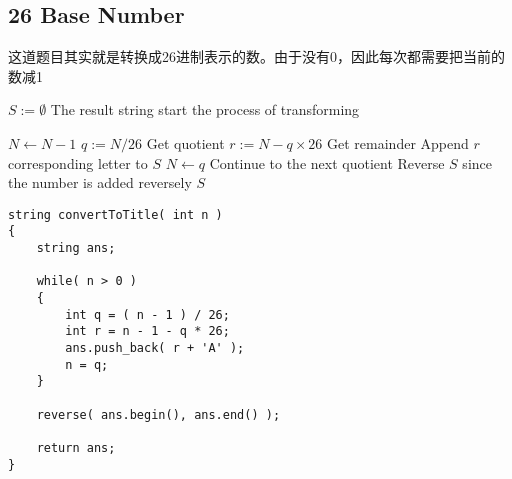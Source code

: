 \subsection{26 Base Number}
\begin{CJK*}{UTF8}{gbsn}
这道题目其实就是转换成26进制表示的数。由于没有0，因此每次都需要把当前的数减1
\end{CJK*}
\setcounter{algorithm}{0}
\begin{algorithm}[H]
\caption{}
\begin{algorithmic}[1]
\State $S:=\emptyset$ \Comment The result string
\State start the process of transforming
\end{algorithmic}
\end{algorithm}
\begin{algorithm}[H]
\begin{algorithmic}[1]
\State $N\gets N-1$
\State $q:=N/26$ \Comment Get quotient
\State $r:=N - q \times 26$ \Comment Get remainder
\State Append $r$ corresponding letter to $S$
\State $N\gets q$ \Comment Continue to the next quotient
\EndWhile
\State Reverse $S$ since the number is added reversely
\State \Return $S$
\EndProcedure
\end{algorithmic}
\end{algorithm}
\setcounter{lstlisting}{0}
\begin{lstlisting}[style=customc, caption={Source Code}]
string convertToTitle( int n )
{
    string ans;

    while( n > 0 )
    {
        int q = ( n - 1 ) / 26;
        int r = n - 1 - q * 26;
        ans.push_back( r + 'A' );
        n = q;
    }

    reverse( ans.begin(), ans.end() );

    return ans;
}
\end{lstlisting}